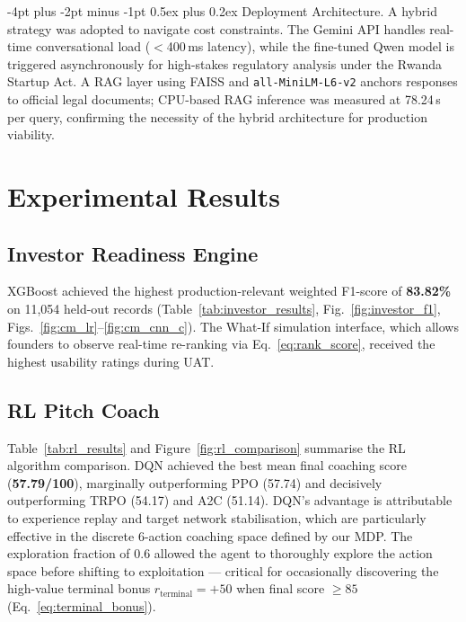 \documentclass{article}
\makeatletter
\renewcommand\paragraph{\@startsection{paragraph}{4}{\z@}%
  {-4pt plus -2pt minus -1pt}%
  {0.5ex plus 0.2ex}%
  {\normalsize\bf}}
\makeatother
\begin{document}
\paragraph{Deployment Architecture.}
A hybrid strategy was adopted to navigate cost constraints.
The Gemini API handles real-time conversational load ($<$400\,ms latency),
while the fine-tuned Qwen model is triggered asynchronously for high-stakes
regulatory analysis under the Rwanda Startup Act. A RAG layer using FAISS
and \texttt{all-MiniLM-L6-v2} anchors responses to official legal documents;
CPU-based RAG inference was measured at 78.24\,s per query, confirming the
necessity of the hybrid architecture for production viability.


\FloatBarrier
\section{Experimental Results}

\FloatBarrier
\subsection{Investor Readiness Engine}

XGBoost achieved the highest production-relevant weighted F1-score of
\textbf{83.82\%} on 11{,}054 held-out records (Table~\ref{tab:investor_results},
Fig.~\ref{fig:investor_f1}, Figs.~\ref{fig:cm_lr}--\ref{fig:cm_cnn_c}).
The What-If simulation interface, which allows founders to observe real-time
re-ranking via Eq.~\eqref{eq:rank_score}, received the highest usability ratings
during UAT.

\FloatBarrier
\subsection{RL Pitch Coach}

Table~\ref{tab:rl_results} and Figure~\ref{fig:rl_comparison} summarise the
RL algorithm comparison. DQN achieved the best mean final coaching score
(\textbf{57.79/100}), marginally outperforming PPO (57.74) and decisively
outperforming TRPO (54.17) and A2C (51.14). DQN's advantage is attributable
to experience replay and target network stabilisation, which are particularly
effective in the discrete 6-action coaching space defined by our MDP.
The exploration fraction of 0.6 allowed the agent to thoroughly explore the
action space before shifting to exploitation --- critical for occasionally
discovering the high-value terminal bonus $r_\text{terminal}=+50$ when final
score $\geq 85$ (Eq.~\eqref{eq:terminal_bonus}).
\end{document}
